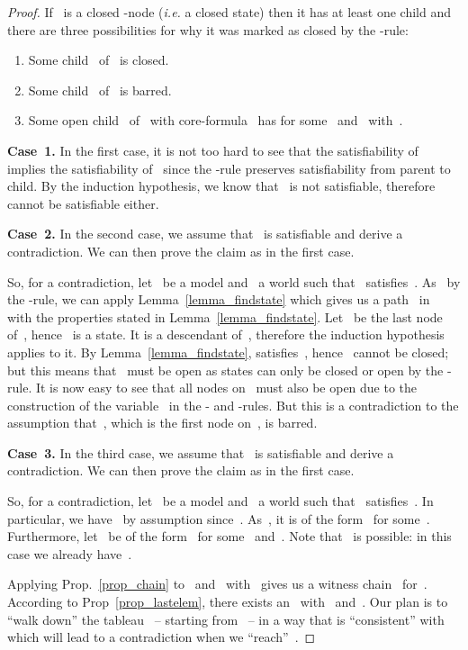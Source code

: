\documentclass{entcs}
\newcommand{\ie}{\emph{i.e.}}
\newcommand{\trea}{}
\begin{document}
\begin{center}
\begin{proof}
  If~ is a closed \trea{}-node
  (\ie{} a closed state)
  then it has at least one child and there are three possibilities
  for why it was marked as closed by the \trea{}-rule:
  \renewcommand{\theenumi}{(\arabic{enumi})}
  \renewcommand{\labelenumi}{\theenumi}
  \begin{enumerate}
  \item Some child~ of~ is closed.
  \item Some child~ of~ is barred.
  \item Some open child~ of~ with core-formula~
    has 
    for some~ and~ with~.
  \end{enumerate}

  \noindent{}\textbf{Case~1.}
  In the first case,
  it is not too hard to see
  that the satisfiability of~ implies the satisfiability of~
  since the \trea{}-rule preserves satisfiability from parent to child.
  By the induction hypothesis,
  we know that~ is not satisfiable,
  therefore~ cannot be satisfiable either.

  \noindent{}\textbf{Case~2.}
  In the second case,
  we assume that~ is satisfiable and derive a contradiction.
  We can then prove the claim as in the first case.

  So, for a contradiction,
  let~ be a model and~ a world
  such that~ satisfies~.
  As~ by the \trea{}-rule,
  we can apply Lemma~\ref{lemma_findstate}
  which gives us a path~ in~ with the properties stated in Lemma~\ref{lemma_findstate}.
  Let~ be the last node of~, hence~ is a state.
  It is a descendant of~,
  therefore the induction hypothesis applies to it.
  By Lemma~\ref{lemma_findstate},  satisfies~,
  hence~ cannot be closed;
  but this means that~ must be open 
  as states can only be closed or open by the \trea{}-rule.
  It is now easy to see that all nodes on~ must also be open 
  due to the construction of the variable~ in the - and -rules.
  But this is a contradiction to the assumption
  that~, which is the first node on~, is barred.

  \noindent{}\textbf{Case~3.}
  In the third case,
  we assume that~ is satisfiable and derive a contradiction.
  We can then prove the claim as in the first case.

  So, for a contradiction,
  let~ be a model and~ a world
  such that~ satisfies~.
  In particular, we have~ by assumption since~.
  As~,
  it is of the form~
  for some~.
  Furthermore,
  let~ be of the form~
  for some~ and~.
  Note that~ is possible:
  in this case we already have~.

  Applying Prop.~\ref{prop_chain} to~ and~
  with~
  gives us a witness chain~ for~.
  According to Prop~\ref{prop_lastelem},
  there exists an~ with~
  and~.
  Our plan is to ``walk down'' the tableau~ -- starting from~ --
  in a way that is ``consistent'' with~
  which will lead to a contradiction when we ``reach''~.


\end{proof}
\end{center}
\end{document}
